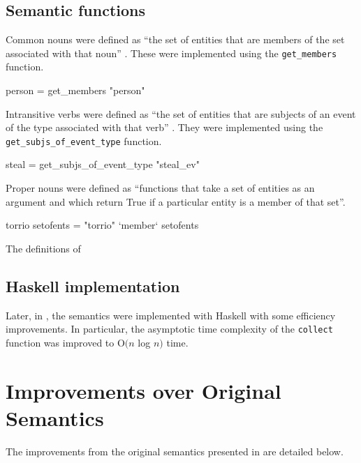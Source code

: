 \documentclass[../main.tex]{subfiles}
\begin{document}
\subsection{Semantic functions}

Common nouns were defined as ``the set of entities that are members of the set associated with that noun'' \cite{frost2014denotational}.
These were implemented using the \texttt{get\_members} function.

\begin{code}
	person = get_members "person"
\end{code}

Intransitive verbs were defined as ``the set of entities that are subjects of an event of the type associated with that verb'' \cite{frost2014denotational}.
They were implemented using the \texttt{get\_subjs\_of\_event\_type} function.

\begin{code}
	steal = get_subjs_of_event_type "steal_ev"
\end{code}

Proper nouns were defined as ``functions that take a set of entities as an argument and which return True if a particular entity is a member of that set''\cite{frost2014denotational}.

\begin{code}
	torrio setofents  = "torrio" `member` setofents
\end{code}

The definitions of

\begin{definition}[Image]

\end{definition}

\subsection{Haskell implementation}

Later, in \cite{agboola2015extensible}, the semantics were implemented with Haskell with some efficiency improvements.  In particular, the asymptotic time complexity of the \texttt{collect} function was improved to O$(n$ log $n)$ time.

\section{Improvements over Original Semantics}

The improvements from the original semantics presented in \cite{frost2014demonstration} \cite{frostagboola2014} are detailed below.
\end{document}
